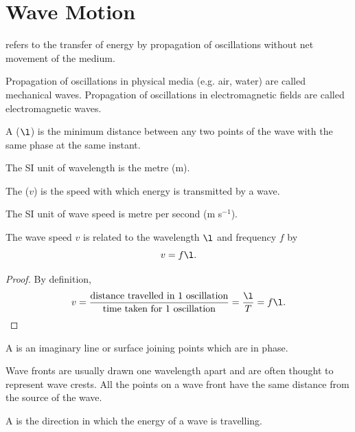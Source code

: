 \chapter{Wave Motion}

\begin{definition}
     refers to the transfer of energy by propagation of oscillations without net movement of the medium.
\end{definition}

Propagation of oscillations in physical media (e.g. air, water) are called mechanical waves. Propagation of oscillations in electromagnetic fields are called electromagnetic waves.

\begin{definition}
    A  ($\l$) is the minimum distance between any two points of the wave with the same phase at the same instant.
\end{definition}

The SI unit of wavelength is the metre (m).

\begin{definition}
    The  ($v$) is the speed with which energy is transmitted by a wave.
\end{definition}

The SI unit of wave speed is metre per second (m s$^{-1}$).

\begin{proposition}
    The wave speed $v$ is related to the wavelength $\l$ and frequency $f$ by \[v = f\l.\]
\end{proposition}
\begin{proof}
    By definition, \[v = \frac{\text{distance travelled in 1 oscillation}}{\text{time taken for 1 oscillation}} = \frac{\l}{T} = f\l.\]
\end{proof}

\begin{definition}
    A  is an imaginary line or surface joining points which are in phase.
\end{definition}

Wave fronts are usually drawn one wavelength apart and are often thought to represent wave crests. All the points on a wave front have the same distance from the source of the wave.

\begin{definition}
    A  is the direction in which the energy of a wave is travelling.
\end{definition}

